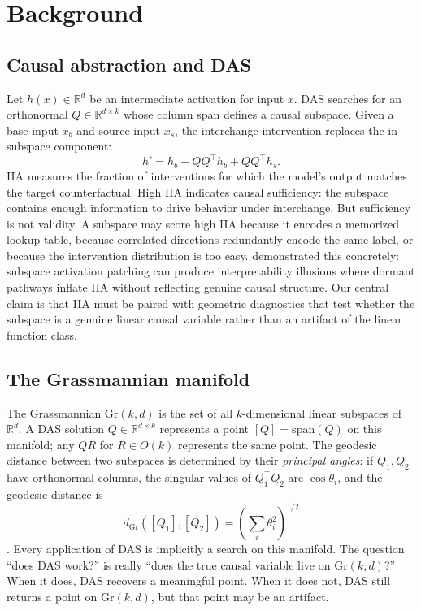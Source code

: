 \documentclass{article}
\newcommand{\Gr}{\mathrm{Gr}}
\newcommand{\R}{\mathbb{R}}
\newcommand{\dgr}{d_{\Gr}}
\newcommand{\Span}{\mathrm{span}}
\begin{document}
\section{Background}
\label{sec:background}

\subsection{Causal abstraction and DAS}

Let $h(x) \in \R^d$ be an intermediate activation for input $x$. DAS searches
for an orthonormal $Q \in \R^{d \times k}$ whose column span defines a causal
subspace. Given a base input $x_b$ and source input $x_s$, the interchange
intervention replaces the in-subspace component:
\begin{equation}
h' = h_b - QQ^\top h_b + QQ^\top h_s .
\label{eq:intervention}
\end{equation}
IIA measures the fraction of interventions for which the model's output matches
the target counterfactual. High IIA indicates causal sufficiency: the subspace
contains enough information to drive behavior under interchange. But sufficiency
is not validity. A subspace may score high IIA because it encodes a memorized
lookup table, because correlated directions redundantly encode the same label, or
because the intervention distribution is too easy.
\citet{makelov2024illusion} demonstrated this concretely: subspace activation
patching can produce interpretability illusions where dormant pathways inflate IIA
without reflecting genuine causal structure. Our central claim is that IIA must be
paired with geometric diagnostics that test whether the subspace is a genuine
linear causal variable rather than an artifact of the linear function class.

\subsection{The Grassmannian manifold}
\label{sec:grassmannian_background}

The Grassmannian $\Gr(k,d)$ is the set of all $k$-dimensional linear subspaces
of $\R^d$. A DAS solution $Q \in \R^{d \times k}$ represents a point
$[Q] = \Span(Q)$ on this manifold; any $QR$ for $R \in O(k)$ represents the
same point. The geodesic distance between two subspaces is determined by their
\emph{principal angles}: if $Q_1, Q_2$ have orthonormal columns, the singular
values of $Q_1^\top Q_2$ are $\cos \theta_i$, and the geodesic distance is
\begin{equation}
\dgr([Q_1],[Q_2]) = \left(\sum_i \theta_i^2\right)^{1/2}
\label{eq:geodesic}
\end{equation}
\citep{edelman1998geometry, absil2008optimization}. Every application of DAS is
implicitly a search on this manifold. The question ``does DAS work?'' is
really ``does the true causal variable live on $\Gr(k,d)$?'' When it does, DAS
recovers a meaningful point. When it does not, DAS still returns a point on
$\Gr(k,d)$, but that point may be an artifact.
\end{document}
